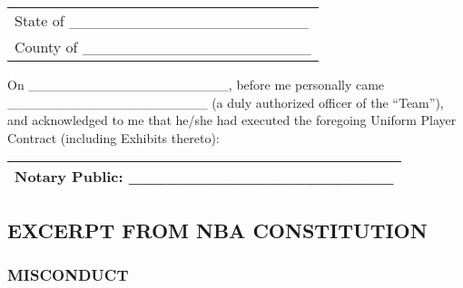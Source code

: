 \documentclass[
]{book}
\begin{document}
\begin{longtable}[]{@{}l@{}}
\toprule()
\endhead
State of \_\_\_\_\_\_\_\_\_\_\_\_\_\_\_\_\_\_\_\_\_\_ \\
County of \_\_\_\_\_\_\_\_\_\_\_\_\_\_\_\_\_\_\_\_\_ \\
\bottomrule()
\end{longtable}

On \_\_\_\_\_\_\_\_\_\_\_\_\_\_\_\_\_\_\_\_\_, before me personally came \_\_\_\_\_\_\_\_\_\_\_\_\_\_\_\_\_\_\_\_\_ (a duly authorized officer of the ``Team''), and acknowledged to me that he/she had executed the foregoing Uniform Player Contract (including Exhibits thereto):

\begin{longtable}[]{@{}l@{}}
\toprule()
\endhead
Notary Public: \_\_\_\_\_\_\_\_\_\_\_\_\_\_\_\_\_\_\_\_\_ \\
\bottomrule()
\end{longtable}

\newpage

\hypertarget{excerpt-from-nba-constitution}{%
\subsection{EXCERPT FROM NBA CONSTITUTION}\label{excerpt-from-nba-constitution}}

\hypertarget{misconduct}{%
\subsubsection{MISCONDUCT}\label{misconduct}}
\end{document}
